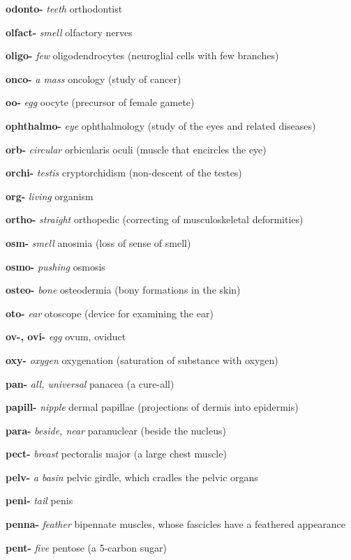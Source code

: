 \documentclass[10pt]{article}
\begin{document}
\begin{multicols}{2}
\begin{hangparas}{10pt}{1}
 \textbf{odonto-} \textit{teeth} orthodontist \par
 \textbf{olfact-} \textit{smell} olfactory nerves \par
 \textbf{oligo-} \textit{few} oligodendrocytes (neuroglial cells with few branches) \par
 \textbf{onco-} \textit{a mass} oncology (study of cancer) \par
 \textbf{oo-} \textit{egg} oocyte (precursor of female gamete) \par
 \textbf{ophthalmo-} \textit{eye} ophthalmology (study of the eyes and related diseases) \par
 \textbf{orb-} \textit{circular} orbicularis oculi (muscle that encircles the eye) \par
 \textbf{orchi-} \textit{testis} cryptorchidism (non-descent of the testes) \par
 \textbf{org-} \textit{living} organism \par
 \textbf{ortho-} \textit{straight} orthopedic (correcting of musculoskeletal deformities) \par
 \textbf{osm-} \textit{smell} anosmia (loss of sense of smell) \par
 \textbf{osmo-} \textit{pushing} osmosis \par
 \textbf{osteo-} \textit{bone} osteodermia (bony formations in the skin) \par
 \textbf{oto-} \textit{ear} otoscope (device for examining the ear) \par
 \textbf{ov-, ovi-} \textit{egg} ovum, oviduct \par
 \textbf{oxy-} \textit{oxygen} oxygenation (saturation of substance with oxygen) \par
 \textbf{pan-} \textit{all, universal} panacea (a cure-all) \par
 \textbf{papill-} \textit{nipple} dermal papillae (projections of dermis into epidermis) \par
 \textbf{para-} \textit{beside, near} paranuclear (beside the nucleus) \par
 \textbf{pect-} \textit{breast} pectoralis major (a large chest muscle) \par
 \textbf{pelv-} \textit{a basin} pelvic girdle, which cradles the pelvic organs \par
 \textbf{peni-} \textit{tail} penis \par
 \textbf{penna-} \textit{feather} bipennate muscles, whose fascicles have a feathered appearance \par
 \textbf{pent-} \textit{five} pentose (a 5-carbon sugar) \par

\end{hangparas}
\end{multicols}
\end{document}
